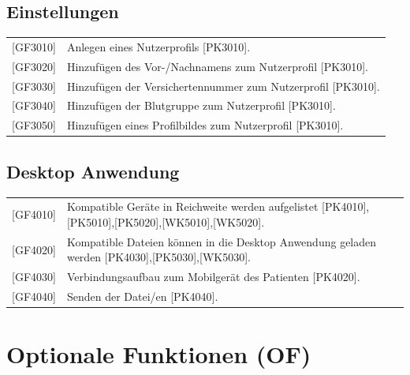 \documentclass[a4paper]{scrreprt}
\begin{document}
\subsection{Einstellungen}
\begin{tabular}{lll}
[GF3010]&  \multicolumn{2}{p{12cm}}{Anlegen eines Nutzerprofils [PK3010].}\\
{[GF3020]} &  \multicolumn{2}{p{12cm}}{Hinzufügen des Vor-/Nachnamens zum Nutzerprofil [PK3010].}  \\
{[GF3030]} &  \multicolumn{2}{p{12cm}}{Hinzufügen der \gls{Versichertennummer} zum Nutzerprofil [PK3010].}  \\
{[GF3040]} &  \multicolumn{2}{p{12cm}}{Hinzufügen der Blutgruppe zum Nutzerprofil [PK3010].}  \\
{[GF3050]} &  \multicolumn{2}{p{12cm}}{Hinzufügen eines Profilbildes zum Nutzerprofil [PK3010].}  \\
\end{tabular}

\subsection{\gls{Desktop Anwendung}}
\begin{tabular}{lll}
[GF4010]&  \multicolumn{2}{p{12cm}}{Kompatible Geräte in Reichweite werden aufgelistet [PK4010],[PK5010],[PK5020],[WK5010],[WK5020].}\\
{[GF4020]} &  \multicolumn{2}{p{12cm}}{Kompatible Dateien können in die \gls{Desktop Anwendung} geladen werden [PK4030],[PK5030],[WK5030].}  \\
{[GF4030]} &  \multicolumn{2}{p{12cm}}{Verbindungsaufbau zum Mobilgerät des Patienten [PK4020].}  \\
{[GF4040]} &  \multicolumn{2}{p{12cm}}{Senden der Datei/en [PK4040].}  \\
\end{tabular}

\section{Optionale Funktionen (OF)}
\end{document}
